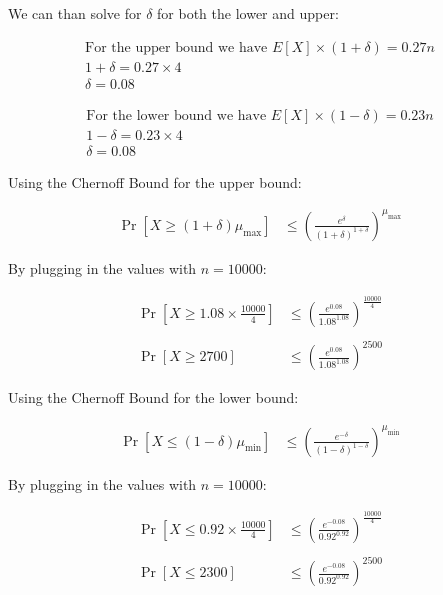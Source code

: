 \documentclass{article}
\begin{document}
\noindent We can than solve for \(\delta\) for both the lower and upper:

\begin{align*}
\text{For the upper bound we have } E[X] \times (1+ \delta)=0.27n \\
1 + \delta = 0.27 \times 4 \\
\delta = 0.08
\end{align*}

\begin{align*}
\text{For the lower bound we have } E[X] \times (1 - \delta)=0.23n \\
1 - \delta = 0.23 \times 4 \\
\delta = 0.08
\end{align*}

\vspace{1em}

\noindent Using the Chernoff Bound for the upper bound:

\begin{align*}
\Pr \left[ X \geq (1 + \delta) \mu_{\text{max}} \right] &\leq \left(\frac{e^{\delta}}{(1+\delta)^{1+\delta}} \right)^{\mu_{\text{max}}}
\end{align*}

\noindent By plugging in the values with \(n=10000\):

\begin{align*}
\Pr \left[ X \geq 1.08 \times \frac{10000}{4} \right] &\leq \left(\frac{e^{0.08}}{1.08^{1.08}} \right)^{\frac{10000}{4}} \\ \\
\Pr \left[ X \geq 2700 \right] &\leq \left(\frac{e^{0.08}}{1.08^{1.08}} \right)^{2500}
\end{align*}

\noindent Using the Chernoff Bound for the lower bound:

\begin{align*}
\Pr \left[ X \leq (1 - \delta) \mu_{\text{min}} \right] &\leq \left(\frac{e^{-\delta}}{(1-\delta)^{1-\delta}} \right)^{\mu_{\text{min}}}
\end{align*}

\noindent By plugging in the values with \(n=10000\):

\begin{align*}
\Pr \left[ X \leq 0.92 \times \frac{10000}{4} \right] &\leq \left(\frac{e^{-0.08}}{0.92^{0.92}} \right)^{\frac{10000}{4}} \\ \\ 
\Pr \left[ X \leq 2300 \right] &\leq \left(\frac{e^{-0.08}}{0.92^{0.92}} \right)^{2500}
\end{align*}
\end{document}
